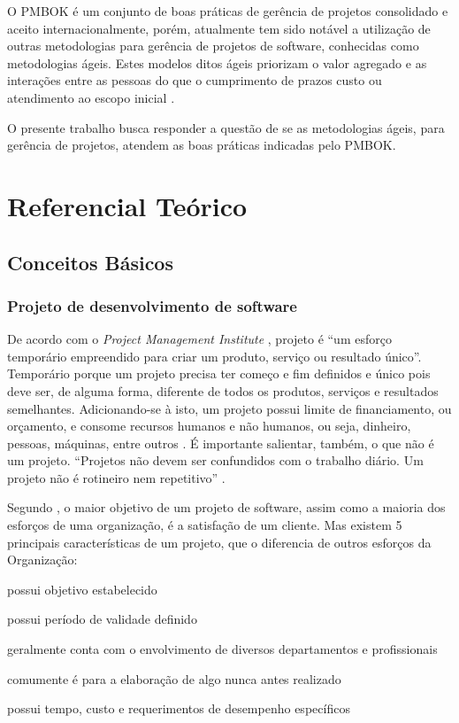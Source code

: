 \documentclass[
    12pt,               %
    openright,          %
    twoside,            %
    a4paper,            %
    chapter=TITLE,     %
    english,            %
    spanish,            %
    portuguese              %
    ]{abntex2}
\newcommand\dblquote[1]{\textquotedblleft #1\textquotedblright}
\begin{document}
O PMBOK é um conjunto de boas práticas de gerência de projetos consolidado e aceito internacionalmente, porém, atualmente tem sido notável a utilização de outras metodologias para gerência de projetos de software, conhecidas como metodologias ágeis. Estes modelos ditos ágeis priorizam o valor agregado e as interações entre as pessoas do que o cumprimento de prazos custo ou atendimento ao escopo inicial \cite[p.~xxi]{prikladnickiAtAll}.


O presente trabalho busca responder a questão de se as metodologias ágeis, para gerência de projetos, atendem as boas práticas indicadas pelo PMBOK.



\chapter{Referencial Teórico}

\section{Conceitos Básicos}

\subsection{Projeto de desenvolvimento de software}

De acordo com o \textit{Project Management Institute} \cite{pmi2013}, projeto é \dblquote{um esforço temporário empreendido para criar um produto, serviço ou resultado único}. Temporário porque um projeto precisa ter começo e fim definidos e único pois deve ser, de alguma forma, diferente de todos os produtos, serviços e resultados semelhantes. Adicionando-se à isto, um projeto possui limite de financiamento, ou orçamento, e consome recursos humanos e não humanos, ou seja, dinheiro, pessoas, máquinas, entre outros \cite[p.~2]{kerzner2011}. É importante salientar, também, o que não é um projeto. \dblquote{Projetos não devem ser confundidos com o trabalho diário. Um projeto não é rotineiro nem repetitivo} \cite[p.~6]{grayLarson2009}.

Segundo , o maior objetivo de um projeto de software, assim como a maioria dos esforços de uma organização, é a satisfação de um cliente. Mas existem 5 principais características de um projeto, que o diferencia de outros esforços da Organização: 

\begin{alineas}
	\item possui objetivo estabelecido
	\item possui período de validade definido
	\item geralmente conta com o envolvimento de diversos departamentos e profissionais
	\item comumente é para a elaboração de algo nunca antes realizado
	\item possui tempo, custo e requerimentos de desempenho específicos
\end{alineas}
\end{document}
